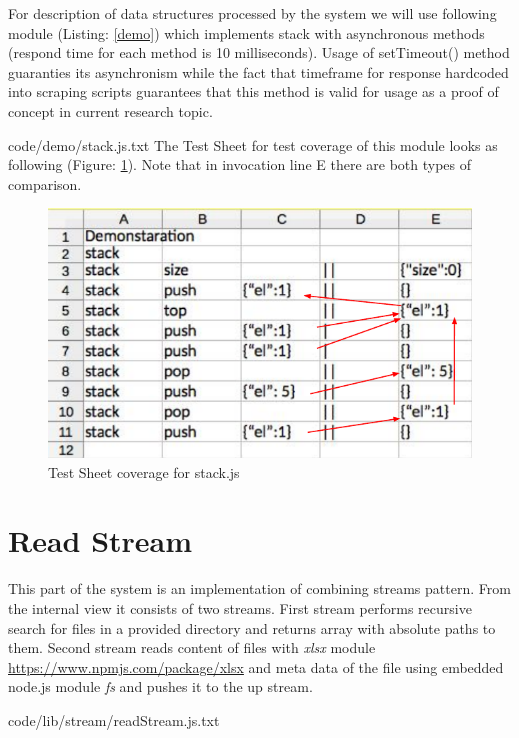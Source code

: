 For description of data structures processed by the system we will use following module (Listing: \ref{demo}) which implements stack with asynchronous methods (respond time for each method is 10 milliseconds). Usage of setTimeout() method guaranties its asynchronism while the fact that timeframe for response hardcoded into scraping scripts guarantees that this method is valid for usage as a proof of concept in current research topic.

{code/demo/stack.js.txt}
The Test Sheet for test coverage of this module looks as following (Figure: \ref{fig:demoTS}). Note that in invocation line E there are both types of comparison.
\begin{figure}
\centering
\includegraphics[scale=0.7]{grafiken/demoTS}
\caption{Test Sheet coverage for stack.js}
\label{fig:demoTS}
\end{figure}



\section{Read Stream}

This part of the system is an implementation of combining streams pattern. From the internal view it consists of two streams. First stream performs recursive search for files in a provided directory and returns array with absolute paths to them. Second stream reads content of files with \textit{xlsx} module \url{https://www.npmjs.com/package/xlsx} and meta data of the file using embedded node.js module \textit{fs} and pushes it to the up stream.


{code/lib/stream/readStream.js.txt}

